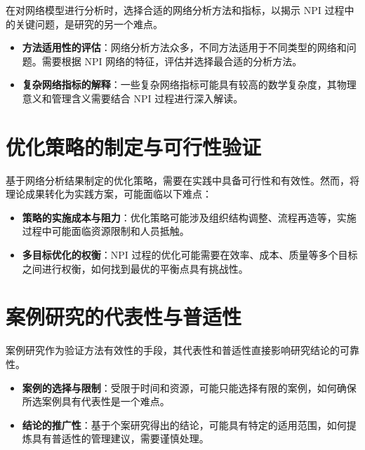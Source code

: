 在对网络模型进行分析时，选择合适的网络分析方法和指标，以揭示 NPI 过程中的关键问题，是研究的另一个难点。

\begin{itemize}
  \item \textbf{方法适用性的评估}：网络分析方法众多，不同方法适用于不同类型的网络和问题。需要根据 NPI 网络的特征，评估并选择最合适的分析方法\citep{newman2010networks}。
  
  \item \textbf{复杂网络指标的解释}：一些复杂网络指标可能具有较高的数学复杂度，其物理意义和管理含义需要结合 NPI 过程进行深入解读\citep{estrada2011structure}。
\end{itemize}

\section{优化策略的制定与可行性验证}

基于网络分析结果制定的优化策略，需要在实践中具备可行性和有效性。然而，将理论成果转化为实践方案，可能面临以下难点：

\begin{itemize}
  \item \textbf{策略的实施成本与阻力}：优化策略可能涉及组织结构调整、流程再造等，实施过程中可能面临资源限制和人员抵触\citep{repenning2001understanding}。
  
  \item \textbf{多目标优化的权衡}：NPI 过程的优化可能需要在效率、成本、质量等多个目标之间进行权衡，如何找到最优的平衡点具有挑战性\citep{marler2004survey}。
\end{itemize}

\section{案例研究的代表性与普适性}

案例研究作为验证方法有效性的手段，其代表性和普适性直接影响研究结论的可靠性。

\begin{itemize}
  \item \textbf{案例的选择与限制}：受限于时间和资源，可能只能选择有限的案例，如何确保所选案例具有代表性是一个难点\citep{yin2017case}。
  
  \item \textbf{结论的推广性}：基于个案研究得出的结论，可能具有特定的适用范围，如何提炼具有普适性的管理建议，需要谨慎处理\citep{flyvbjerg2006five}。
\end{itemize}

